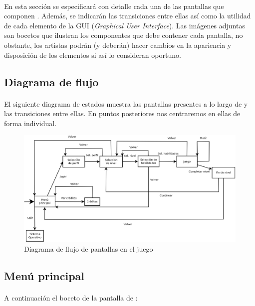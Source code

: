 \paragraph{}
En esta sección se especificará con detalle cada una de las pantallas que
componen \juego. Además, se indicarán las transiciones entre ellas así
como la utilidad de cada elemento de la GUI (\emph{Graphical User Interface}).
Las imágenes adjuntas son bocetos que ilustran los componentes que debe contener
cada pantalla, no obstante, los artistas podrán (y deberán) hacer cambios en la apariencia
y disposición de los elementos si así lo consideran oportuno.


\subsection{Diagrama de flujo}
\label{sec:ui-flujo}

\paragraph{}
El siguiente diagrama de estados muestra las pantallas presentes a lo largo
de \juego y las transiciones entre ellas. En puntos posteriores nos centraremos
en ellas de forma individual.

\begin{figure}[H]
    \centering
        \includegraphics[width=\textwidth]{img/flowchart.png} 
    \caption{Diagrama de flujo de pantallas en el juego}
    \label{img:flowchart}
\end{figure}

\clearpage

\subsection{Menú principal}
\label{sec:ui-menu}

\paragraph{}
A continuación el boceto de la pantalla de \menu:

